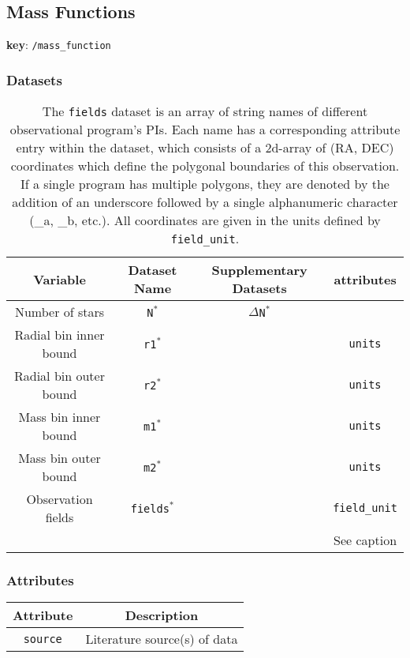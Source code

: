 \subsection{Mass Functions}

\textbf{key}: \texttt{/mass\_function}

\subsubsection{Datasets}

\begin{center}
\begin{table}[H]
\begin{tabular}{ | c | c | c | c | }
    \hline
    Variable & Dataset Name & Supplementary Datasets &  attributes \\
    \hline\hline
    Number of stars & \texttt{N\(^*\)} & \texttt{\(\Delta\)N\(^*\)} & \\
    \hline
    Radial bin inner bound & \texttt{r1\(^*\)} & & \texttt{units} \\
    \hline
    Radial bin outer bound & \texttt{r2\(^*\)} & & \texttt{units} \\
    \hline
    Mass bin inner bound & \texttt{m1\(^*\)} & & \texttt{units} \\
    \hline
    Mass bin outer bound & \texttt{m2\(^*\)} & & \texttt{units} \\
    \hline
    Observation fields & \texttt{fields\(^*\)} & &
    \texttt{field\_unit}\\ &&& See caption \\
    \hline
\end{tabular}
\caption*{
    The \texttt{fields} dataset is an array of string names of different
    observational program's PIs. Each name has a corresponding attribute entry
    within the dataset, which consists of a 2d-array of (RA, DEC) coordinates
    which define the polygonal boundaries of this observation. If a single
    program has multiple polygons, they are denoted by the addition of an
    underscore followed by a single alphanumeric character (\_a, \_b, etc.).
    All coordinates are given in the units defined by \texttt{field\_unit}.
}
\end{table}
\end{center}



\subsubsection{Attributes}

\begin{center}
\begin{table}[H]
\begin{tabular}{ | c | c | }
    \hline
    Attribute & Description \\
    \hline\hline
    \texttt{source} & Literature source(s) of data \\
    \hline
\end{tabular}
\end{table}
\end{center}
